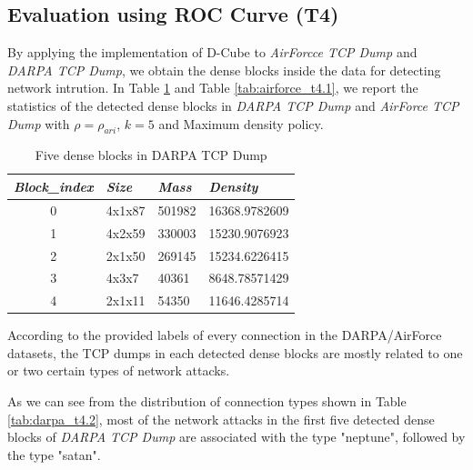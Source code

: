 \eit


\subsection{Evaluation using ROC Curve (T4)}

By applying the implementation of D-Cube to \textit{AirForcce TCP Dump} and \textit{DARPA TCP Dump}, we obtain the dense blocks inside the data for detecting network intrution. In Table \ref{tab:darpa_t4.1} and Table \ref{tab:airforce_t4.1}, we report the statistics of the detected dense blocks in \textit{DARPA TCP Dump} and \textit{AirForce TCP Dump} with $\rho=\rho_{ari}$, $k=5$ and Maximum density policy.  

\renewcommand{\arraystretch}{1.2}
\begin{table}[!ht]
\centering
\caption{Five dense blocks in DARPA TCP Dump}
\label{tab:darpa_t4.1}
\begin{tabular}{|c|p{2cm}|p{2cm}|p{3cm}|}
\hline
\textit{\textbf{Block\_index}} & \textit{\textbf{Size}} & \textit{\textbf{Mass}} & \textit{\textbf{Density}} \\ \hline
{0}      & 4x1x87     & 501982       & 16368.9782609                            \\ \hline
{1}      & 4x2x59     & 330003       & 15230.9076923                            \\ \hline
{2}      & 2x1x50     & 269145       & 15234.6226415                           \\ \hline
{3}      & 4x3x7      & 40361        & 8648.78571429                           \\ \hline
{4}      & 2x1x11     & 54350        & 11646.4285714                           \\ \hline
\end{tabular}
\end{table}

According to the provided labels of every connection in the DARPA/AirForce datasets, the TCP dumps in each detected dense blocks are mostly related to one or two certain types of network attacks. 

As we can see from the distribution of connection types shown in Table \ref{tab:darpa_t4.2}, most of the network attacks in the first five detected dense blocks of \textit{DARPA TCP Dump} are associated with the type "neptune", followed by the type "satan". 


